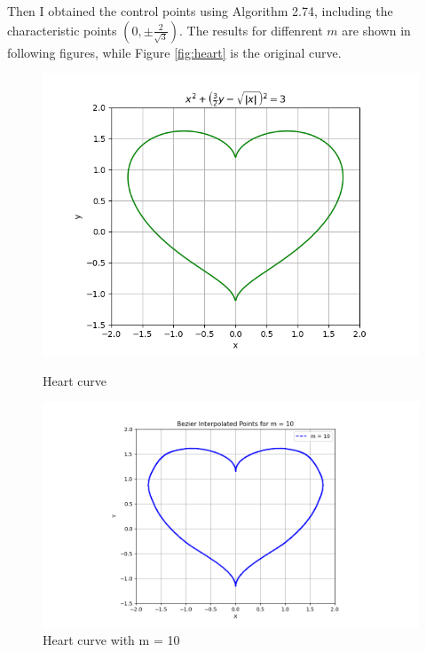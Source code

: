 \documentclass[a4paper]{article}
\begin{document}
Then I obtained the control points using Algorithm 2.74, including the characteristic points \((0, \pm \frac{2}{\sqrt{3}})\). The results for diffenrent \(m\) are shown in following figures, while Figure \ref{fig:heart} is the original curve.
\begin{figure}[ht]
  \centering
  \begin{minipage}[b]{0.45\textwidth}
    \centering
    \includegraphics[width=\textwidth]{figures/bezier0.png}
    \caption{Heart curve}
    \label{fig:heart}
  \end{minipage}
  \hfill
  \begin{minipage}[b]{0.45\textwidth}
    \centering
    \includegraphics[width=\textwidth]{figures/bezier1.png}
    \caption{Heart curve with m = 10}
    \label{fig:bezierm10}
  \end{minipage}
  \vfill
  \begin{minipage}[b]{0.45\textwidth}

\end{minipage}
\end{figure}
\end{document}
